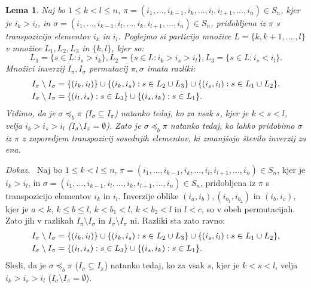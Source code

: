 \documentclass[a4paper, 12pt]{book}
\newtheorem{lema}{Lema}[chapter]
\newenvironment{dokaz}{\emph{Dokaz.}\ }{\hspace{\fill}{$\Box$}}
\begin{document}
\begin{lema}
    Naj bo $1 \leq k < l \leq n$, $\pi = (i_1, ..., i_{k-1}, i_k, ..., i_l, i_{l+1}, ..., i_n) \in S_n$, kjer je $i_k > i_l$, in $\sigma = (i_1, ..., i_{k-1}, i_l, ..., i_k, i_{l+1}, ..., i_n) \in S_n$, pridobljena iz $\pi$ s transpozicijo elementov $i_k$ in $i_l$. Poglejmo si particijo množice $L = \{ k, k+ 1, ...., l\}$ v množice $L_1, L_2, L_3$ in $\{ k, l \}$, kjer so:
    \[
        L_1 = \{ s \in L: i_s > i_k \}, L_2 = \{ s \in L: i_k > i_s > i_l \}, L_3 = \{ s \in L: i_s < i_l \}.
    \]
    Množici inverzij $I_{\pi}, I_{\sigma}$ permutacij $\pi, \sigma$ imata razliki:
    \begin{align}
        I_{\pi} \setminus I_{\sigma} &= \{ (i_k, i_l) \} \cup \{ (i_k, i_s): s \in L_2 \cup L_3 \} \cup \{ (i_s, i_l): s \in L_1 \cup L_2 \}, \notag \\
        I_{\sigma} \setminus I_{\pi} &= \{ (i_l, i_s): s \in L_3 \} \cup \{ (i_s, i_k): s \in L_1 \}. \notag
    \end{align}
    Vidimo, da je $\sigma \preceq_b \pi$ ($I_{\sigma} \subseteq I_{\pi}$) natanko tedaj, ko za vsak $s$, kjer je $k < s < l$, velja $i_k > i_s > i_l$ ($I_{\sigma} \setminus I_{\pi} = \emptyset$). Zato je $\sigma \preceq_b \pi$ natanko tedaj, ko lahko pridobimo $\sigma$ iz $\pi$ z zaporedjem transpozicij sosednjih elementov, ki zmanjšajo število inverzij za ena.
\end{lema}
\begin{dokaz}
    Naj bo $1 \leq k < l \leq n$, $\pi = (i_1, ..., i_{k-1}, i_k, ..., i_l, i_{l+1}, ..., i_n) \in S_n$, kjer je $i_k > i_l$, in $\sigma = (i_1, ..., i_{k-1}, i_l, ..., i_k, i_{l+1}, ..., i_n) \in S_n$, pridobljena iz $\pi$ s transpozicijo elementov $i_k$ in $i_l$. Inverzije oblike $(i_a, i_b), (i_{b_1}, i_{b_2})$ in $(i_b, i_c)$, kjer je $a < k$, $k \leq b \leq l$, $k < b_1 < l$, $k < b_2 < l$ in $l < c$, so v obeh permutacijah. Zato jih v razlikah $I_{\pi} \setminus I_{\sigma}$ in $I_{\sigma} \setminus I_{\pi}$ ni. Razliki sta zato ravno:
    \begin{align}
        I_{\pi} \setminus I_{\sigma} &= \{ (i_k, i_l) \} \cup \{ (i_k, i_s): s \in L_2 \cup L_3 \} \cup \{ (i_s, i_l): s \in L_1 \cup L_2 \}, \notag \\
        I_{\sigma} \setminus I_{\pi} &= \{ (i_l, i_s): s \in L_3 \} \cup \{ (i_s, i_k): s \in L_1 \}. \notag
    \end{align}
    Sledi, da je $\sigma \preceq_b \pi$ ($I_{\sigma} \subseteq I_{\pi}$) natanko tedaj, ko za vsak $s$, kjer je $k < s < l$, velja $i_k > i_s > i_l$ ($I_{\sigma} \setminus I_{\pi} = \emptyset$).
\end{dokaz}
\end{document}
